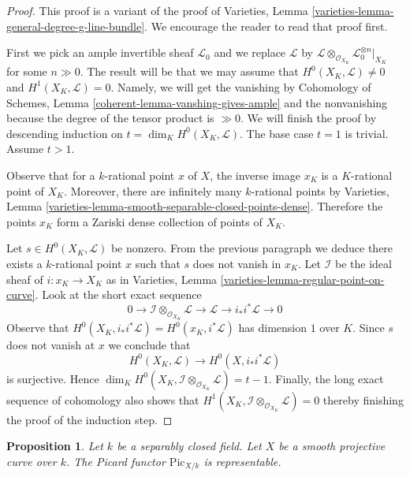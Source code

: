\documentclass{stacks-project}
\theoremstyle{plain}
\newtheorem{proposition}[subsection]{Proposition}
\theoremstyle{definition}
\theoremstyle{remark}
\numberwithin{equation}{subsection}
\def\Picardfunctor{\mathrm{Pic}}
\begin{document}
\begin{proof}
This proof is a variant of the proof of
Varieties, Lemma \ref{varieties-lemma-general-degree-g-line-bundle}.
We encourage the reader to read that proof first.

\medskip\noindent
First we pick an ample invertible sheaf $\mathcal{L}_0$ and
we replace $\mathcal{L}$ by
$\mathcal{L} \otimes_{\mathcal{O}_{X_K}} \mathcal{L}_0^{\otimes n}|_{X_K}$
for some $n \gg 0$. The result will be that we may assume that
$H^0(X_K, \mathcal{L}) \not = 0$ and $H^1(X_K, \mathcal{L}) = 0$.
Namely, we will get the vanishing by Cohomology of Schemes, Lemma
\ref{coherent-lemma-vanshing-gives-ample} and the nonvanishing because
the degree of the tensor product is $\gg 0$.
We will finish the proof by descending induction on
$t = \dim_K H^0(X_K, \mathcal{L})$. The base case $t = 1$ is trivial.
Assume $t > 1$.

\medskip\noindent
Observe that for a $k$-rational point $x$ of $X$, the inverse image $x_K$
is a $K$-rational point of $X_K$. Moreover, there are infinitely many
$k$-rational points by Varieties, Lemma
\ref{varieties-lemma-smooth-separable-closed-points-dense}. Therefore
the points $x_K$ form a Zariski dense collection of points of $X_K$.

\medskip\noindent
Let $s \in H^0(X_K, \mathcal{L})$ be nonzero. From the previous paragraph
we deduce there exists a $k$-rational
point $x$ such that $s$ does not vanish in $x_K$. Let $\mathcal{I}$
be the ideal sheaf of $i : x_K \to X_K$ as in
Varieties, Lemma \ref{varieties-lemma-regular-point-on-curve}. Look at the
short exact sequence
$$
0 \to \mathcal{I} \otimes_{\mathcal{O}_{X_K}} \mathcal{L} \to
\mathcal{L} \to i_*i^*\mathcal{L} \to 0
$$
Observe that $H^0(X_K, i_*i^*\mathcal{L}) = H^0(x_K, i^*\mathcal{L})$
has dimension $1$ over $K$. Since $s$ does not vanish at $x$ we conclude that
$$
H^0(X_K, \mathcal{L}) \longrightarrow H^0(X, i_*i^*\mathcal{L})
$$
is surjective. Hence
$\dim_K H^0(X_K, \mathcal{I} \otimes_{\mathcal{O}_{X_K}} \mathcal{L}) = t - 1$.
Finally, the long exact sequence of cohomology also shows that
$H^1(X_K, \mathcal{I} \otimes_{\mathcal{O}_{X_K}} \mathcal{L}) = 0$
thereby finishing the proof of the induction step.
\end{proof}

\begin{proposition}
\label{proposition-pic-curve}
Let $k$ be a separably closed field. Let $X$ be a smooth projective
curve over $k$. The Picard functor $\Picardfunctor_{X/k}$ is representable.
\end{proposition}
\end{document}
